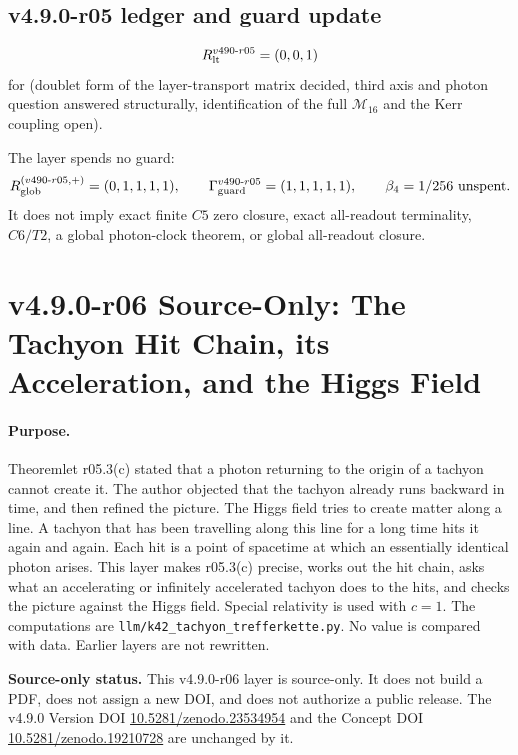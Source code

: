 \subsection*{v4.9.0-r05 ledger and guard update}
\label{subsec:v490-r05-ledger-guard}

\[
R_{\rm lt}^{v490\text{-}r05}=(0,0,1)
\]
for (doublet form of the layer-transport matrix decided, third axis and photon question answered structurally,
identification of the full \(\mathcal M_{16}\) and the Kerr coupling open).

The layer spends no guard:
\[
R_{\rm glob}^{(v490\text{-}r05,+)}=(0,1,1,1,1),
\qquad
\Gamma_{\rm guard}^{v490\text{-}r05}=(1,1,1,1,1),
\qquad
\beta_4=1/256\ \text{unspent}.
\]
It does not imply exact finite \(C5\) zero closure, exact all-readout terminality,
\(C6/T2\), a global photon-clock theorem, or global all-readout closure.

\clearpage
\section*{v4.9.0-r06 Source-Only: The Tachyon Hit Chain, its Acceleration, and the Higgs Field}
\label{sec:v490-r06-hit-chain-higgs}

\paragraph{Purpose.}
Theoremlet r05.3(c) stated that a photon returning to the origin of a tachyon cannot create it.  The author objected that the
tachyon already runs backward in time, and then refined the picture.  The Higgs field tries to create matter along a line.
A tachyon that has been travelling along this line for a long time hits it again and again.  Each hit is a point of
spacetime at which an essentially identical photon arises.  This layer makes r05.3(c) precise, works out the hit chain,
asks what an accelerating or infinitely accelerated tachyon does to the hits, and checks the picture against the Higgs
field.  Special relativity is used with \(c=1\).  The computations are \texttt{llm/k42\_tachyon\_trefferkette.py}.  No
value is compared with data.  Earlier layers are not rewritten.

\noindent\textbf{Source-only status.}
This v4.9.0-r06 layer is source-only.  It does not build a PDF, does not assign a new DOI,
and does not authorize a public release.  The v4.9.0 Version DOI
\href{https://doi.org/10.5281/zenodo.23534954}{10.5281/zenodo.23534954} and the Concept DOI
\href{https://doi.org/10.5281/zenodo.19210728}{10.5281/zenodo.19210728} are unchanged by it.

